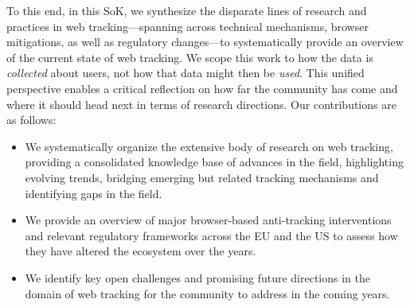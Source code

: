 To this end, in this SoK, we synthesize the disparate lines of research and practices in web tracking---spanning across technical mechanisms, browser mitigations, as well as regulatory changes---to systematically provide an overview of the current state of web tracking. 
%
We scope this work to how the data is \textit{collected} about users, not how that data might then be \textit{used}. 
%
This unified perspective enables a critical reflection on how far the community has come and where it should head next in terms of research directions.
%
Our contributions are as follows:

\begin{itemize}
    \item We systematically organize the extensive body of research on web tracking, providing a consolidated knowledge base of advances in the field, highlighting evolving trends, bridging emerging but related tracking mechanisms and identifying gaps in the field. %

    \item We provide an overview of major browser-based anti-tracking interventions and relevant regulatory frameworks across the EU and the US to assess how they have altered the ecosystem over the years.

    \item We identify key open challenges and promising future directions in the domain of web tracking for the community to address in the coming years.
\end{itemize}